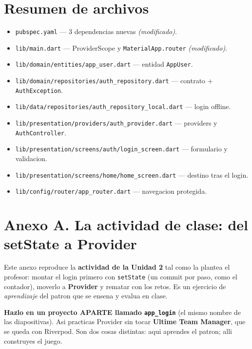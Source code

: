 \documentclass[11pt,a4paper,oneside]{book}
\newcommand{\file}[1]{\texttt{\textcolor{brandDark}{#1}}}
\begin{document}
\chapter*{Resumen de archivos}
\begin{itemize}
  \item \file{pubspec.yaml} --- 3 dependencias nuevas \emph{(modificado)}.
  \item \file{lib/main.dart} --- ProviderScope y \texttt{MaterialApp.router} \emph{(modificado)}.
  \item \file{lib/domain/entities/app\_user.dart} --- entidad \file{AppUser}.
  \item \file{lib/domain/repositories/auth\_repository.dart} --- contrato + \file{AuthException}.
  \item \file{lib/data/repositories/auth\_repository\_local.dart} --- login offline.
  \item \file{lib/presentation/providers/auth\_provider.dart} --- providers y \file{AuthController}.
  \item \file{lib/presentation/screens/auth/login\_screen.dart} --- formulario y validacion.
  \item \file{lib/presentation/screens/home/home\_screen.dart} --- destino tras el login.
  \item \file{lib/config/router/app\_router.dart} --- navegacion protegida.
\end{itemize}

\chapter*{Anexo A. La actividad de clase: del setState a Provider}

Este anexo reproduce la \textbf{actividad de la Unidad 2} tal como la plantea el
profesor: montar el login primero con \texttt{setState} (un commit por paso, como el
contador), moverlo a \textbf{Provider} y rematar con los retos. Es un ejercicio de
\emph{aprendizaje} del patron que se ensena y evalua en clase.

\begin{tipbox}
\textbf{Hazlo en un proyecto APARTE llamado \texttt{app\_login}} (el mismo nombre de
las diapositivas). Asi practicas Provider sin tocar \textbf{Ultime Team Manager}, que
se queda con Riverpod. Son dos cosas distintas: aqui aprendes el patron; alli
construyes el juego.
\end{tipbox}
\end{document}
